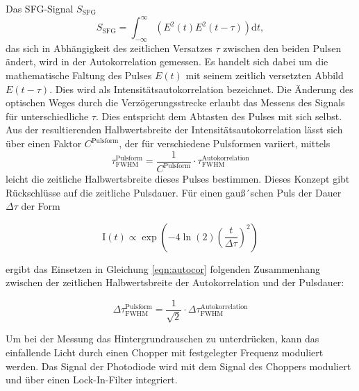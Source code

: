         \FloatBarrier
        Das SFG-Signal $S_{\text{SFG}}$
        \begin{equation}
            S_{\text{SFG}} = \int_{-\infty}^{\infty} \left(E^2 (t)  E^2 (t-\tau)\right) \text{d}t ,
            \label{eqn:autocor}
        \end{equation}
        das sich in Abhängigkeit des zeitlichen Versatzes $\tau$ zwischen den beiden Pulsen ändert, wird in der Autokorrelation gemessen. Es handelt sich dabei um die mathematische Faltung des Pulses $E(t)$ 
        mit seinem zeitlich versetzten Abbild $E(t - \tau)$. Dies wird als Intensitätsautokorrelation bezeichnet. Die Änderung des optischen Weges durch die Verzögerungsstrecke erlaubt das Messens des Signals 
        für unterschiedliche $\tau$. Dies entspricht dem Abtasten des Pulses mit sich selbst. Aus der resultierenden Halbwertsbreite der Intensitätsautokorrelation lässt sich über einen Faktor 
        $C^{\text{Pulsform}}$, der für verschiedene Pulsformen variiert, mittels 
        \begin{equation*}
            \tau_{\text{FWHM}}^{\text{Pulsform}} = \frac{1}{C^{\text{Pulsform}}} \cdot \tau_{\text{FWHM}}^{\text{Autokorrelation}}
        \end{equation*}
        leicht die zeitliche Halbwertsbreite dieses Pulses bestimmen. Dieses Konzept gibt Rückschlüsse auf die zeitliche Pulsdauer. 
        Für einen gauß´schen Puls der Dauer $\Delta \tau$ der Form

        \begin{equation}
          \text{I}(t) \propto \exp\left(-4\ln(2)\left(\frac{t}{\Delta \tau}\right)^2\right)
          \label{eqn:IntGauss}
        \end{equation}

        ergibt das Einsetzen in Gleichung \ref{eqn:autocor} folgenden Zusammenhang zwischen der zeitlichen Halbwertsbreite der Autokorrelation und der Pulsdauer:

        \begin{equation*}
          \Delta\tau_{\text{FWHM}}^{\text{Pulsform}} = \frac{1}{\sqrt{2}} \cdot \Delta\tau_{\text{FWHM}}^{\text{Autokorrelation}}
          \label{eqn:tautau}
        \end{equation*}
        
        Um bei der Messung das Hintergrundrauschen zu unterdrücken, kann das 
        einfallende Licht durch einen Chopper mit festgelegter Frequenz moduliert werden. Das Signal der Photodiode wird mit dem Signal des Choppers moduliert und über einen Lock-In-Filter integriert.


